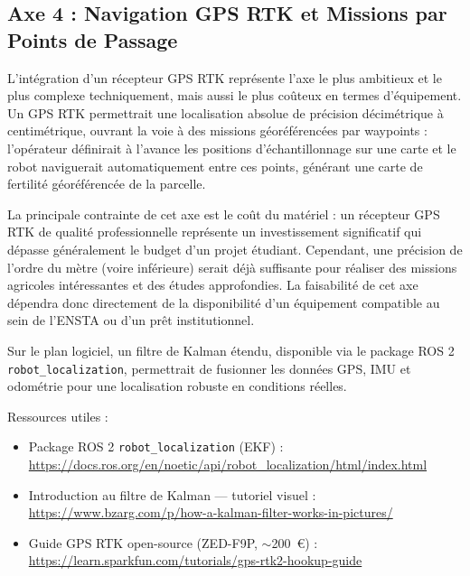 \subsection{Axe 4 : Navigation GPS RTK et Missions par Points de Passage}

L'intégration d'un récepteur GPS RTK représente l'axe le plus ambitieux et le plus complexe techniquement, mais aussi le plus coûteux en termes d'équipement. Un GPS RTK permettrait une localisation absolue de précision décimétrique à centimétrique, ouvrant la voie à des missions géoréférencées par waypoints : l'opérateur définirait à l'avance les positions d'échantillonnage sur une carte et le robot naviguerait automatiquement entre ces points, générant une carte de fertilité géoréférencée de la parcelle.

La principale contrainte de cet axe est le coût du matériel : un récepteur GPS RTK de qualité professionnelle représente un investissement significatif qui dépasse généralement le budget d'un projet étudiant. Cependant, une précision de l'ordre du mètre (voire inférieure) serait déjà suffisante pour réaliser des missions agricoles intéressantes et des études approfondies. La faisabilité de cet axe dépendra donc directement de la disponibilité d'un équipement compatible au sein de l'ENSTA ou d'un prêt institutionnel.

Sur le plan logiciel, un filtre de Kalman étendu, disponible via le package ROS 2 \texttt{robot\_localization}, permettrait de fusionner les données GPS, IMU et odométrie pour une localisation robuste en conditions réelles.

\noindent Ressources utiles :
\begin{itemize}
    \item Package ROS 2 \texttt{robot\_localization} (EKF) : \url{https://docs.ros.org/en/noetic/api/robot_localization/html/index.html}
    \item Introduction au filtre de Kalman --- tutoriel visuel : \url{https://www.bzarg.com/p/how-a-kalman-filter-works-in-pictures/}
    \item Guide GPS RTK open-source (ZED-F9P, $\sim$200~€) : \url{https://learn.sparkfun.com/tutorials/gps-rtk2-hookup-guide}
\end{itemize}
